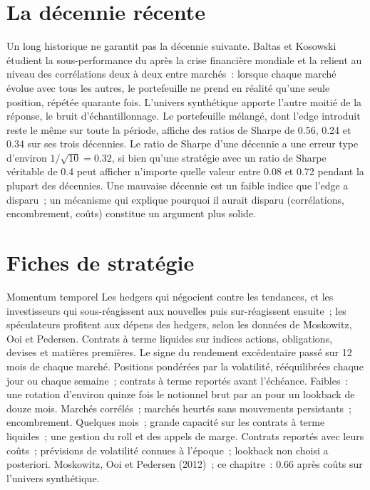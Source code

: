 \section{La décennie récente}

Un long historique ne garantit pas la décennie suivante. Baltas et Kosowski étudient la sous-performance du  après la crise financière
mondiale et la relient au niveau des corrélations deux à deux entre marchés~: lorsque chaque marché évolue avec tous les autres, le portefeuille ne prend en réalité qu'une seule position, répétée quarante fois.
L'univers synthétique apporte l'autre moitié de la réponse, le bruit d'échantillonnage. Le portefeuille mélangé, dont l'edge introduit reste le même sur toute la période, affiche
des ratios de Sharpe de 0.56, 0.24 et 0.34 sur ses trois décennies. Le ratio de Sharpe d'une décennie a une erreur type d'environ $1/\sqrt{10} = 0.32$, si bien qu'une stratégie
avec un ratio de Sharpe véritable de 0.4 peut afficher n'importe quelle valeur entre 0.08 et 0.72 pendant la plupart des décennies. Une mauvaise décennie est un faible indice que l'edge a disparu~; un
mécanisme qui explique pourquoi il aurait disparu (corrélations, encombrement, coûts) constitue un argument plus solide.

\section{Fiches de stratégie}

\begin{strategyfile}{Momentum temporel}\label{strat:s1:trend-following:tsmom}
 Les hedgers qui négocient contre les tendances, et les investisseurs qui sous-réagissent aux nouvelles puis sur-réagissent ensuite~; les spéculateurs profitent aux
dépens des hedgers, selon les données de Moskowitz, Ooi et Pedersen.
 Contrats à terme liquides sur indices actions, obligations, devises et matières premières.
 Le signe du rendement excédentaire passé sur 12 mois de chaque marché.
 Positions pondérées par la volatilité, rééquilibrées chaque jour ou chaque semaine~; contrats à terme reportés avant l'échéance.
 Faibles~: une rotation d'environ quinze fois le notionnel brut par an pour un lookback de douze mois.
 Marchés corrélés~; marchés heurtés sans mouvements persistants~; encombrement.
 Quelques mois~; grande capacité sur les contrats à terme liquides~; une gestion du roll et des appels de marge.
 Contrats reportés avec leurs coûts~; prévisions de volatilité connues à l'époque~; lookback non choisi a posteriori.
 Moskowitz, Ooi et Pedersen (2012)~; ce chapitre~: 0.66 après coûts sur l'univers synthétique.
\end{strategyfile}

